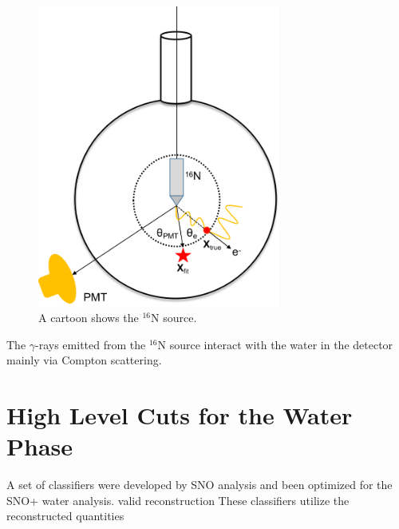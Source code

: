 \begin{figure}[!htb]
	\centering
	\includegraphics[width=8cm]{N16centralDiagram.png}
	\caption{A cartoon shows the $^{16}$N source.}
	\label{N16centralDiagram}
\end{figure}

The $\gamma$-rays emitted from the $^{16}$N source interact with the water in the detector mainly via Compton scattering. 


\section{High Level Cuts for the Water Phase}\label{sect:high_level_cuts}
A set of classifiers were developed by SNO analysis and been optimized for the SNO+ water analysis\cite{highlevel}.
valid reconstruction
These classifiers utilize the reconstructed quantities

